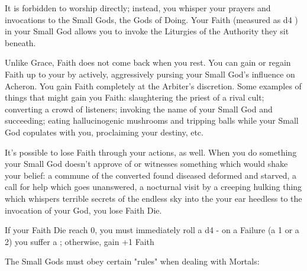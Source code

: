 {It is forbidden to worship \TheAuthority directly; instead, you whisper your prayers and invocations to the Small Gods, the Gods of Doing.  Your Faith (measured as d4 \UD) in your Small God allows you to invoke the Liturgies of the Authority they sit beneath.

Unlike Grace, Faith does not come back when you rest.  You can gain or regain Faith up to your \MAX by actively, aggressively pursing your Small God's influence on Acheron.  You gain Faith \UD completely at the Arbiter's discretion.  Some examples of things that might gain you Faith: slaughtering the priest of a rival cult; converting a crowd of listeners; invoking the name of your Small God and succeeding; eating hallucinogenic mushrooms and tripping balls while your Small God copulates with you, proclaiming your destiny, etc.

It's possible to lose Faith through your actions, as well.  When you do something your Small God doesn't approve of or witnesses something which would shake your belief: a commune of the converted found diseased deformed and starved, a call for help which goes unanswered, a nocturnal visit by a creeping hulking thing which whispers terrible secrets of the endless sky into the your ear heedless to the invocation of your God, you lose Faith Die.

If your Faith Die reach 0, you must immediately roll a d4 - on a Failure (a 1 or a 2) you suffer a ; otherwise, gain +1 Faith \UD

\newpage


The Small Gods must obey certain "rules" when dealing with Mortals:



}
